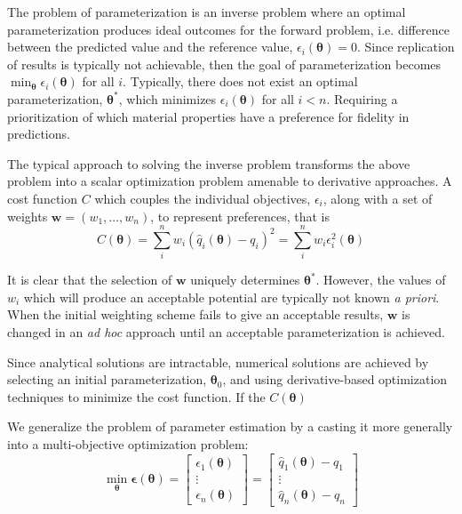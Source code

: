 The problem of parameterization is an inverse problem where an optimal parameterization produces ideal outcomes for the forward problem, i.e. difference between the predicted value and the reference value,
$\epsilon_i(\bm{\theta}) = 0$.
Since replication of results is typically not achievable, then the goal of parameterization becomes
$\min_{\bm{\theta}} \epsilon_i(\bm{\theta})$
for all $i$.  Typically, there does not exist an optimal parameterization, $\bm{\theta}^*$, which minimizes $\epsilon_i(\bm{\theta})$ for all $i < n$.  Requiring a prioritization of which material properties have a preference for fidelity in predictions.

The typical approach to solving the inverse problem transforms the above problem into a scalar optimization problem amenable to derivative approaches.  A cost function $C$ which couples the individual objectives, $\epsilon_i$, along with a set of weights $\bm{w} = (w_1,...,w_n)$, to represent preferences, that is
\begin{equation}
    C(\bm{\theta}) = \sum_i^n w_i (\hat{q}_i(\bm{\theta}) - q_i)^2
                   = \sum_i^n w_i \epsilon_i^2(\bm{\theta})
\end{equation}

It is clear that the selection of $\bm{w}$ uniquely determines $\bm{\theta}^*$.  However, the values of $w_i$ which will produce an acceptable potential are typically not known \emph{a priori}.  When the initial weighting scheme fails to give an acceptable results, $\bm{w}$ is changed in an \emph{ad hoc} approach until an acceptable parameterization is achieved.

Since analytical solutions are intractable, numerical solutions are achieved by selecting an initial parameterization, $\bm{\theta}_0$, and using derivative-based optimization techniques to minimize the cost function.  If the $C(\bm{\theta})$

We generalize the problem of parameter estimation by a casting it more generally into a multi-objective optimization problem:
\begin{equation}
    \min_{\bm{\theta}} \bm{\epsilon}(\bm{\theta})
        = \begin{bmatrix}
            \epsilon_1(\bm{\theta}) \\
            \vdots \\
            \epsilon_n(\bm{\theta})
          \end{bmatrix}
        = \begin{bmatrix}
            \hat{q}_1(\bm{\theta}) - q_1 \\
            \vdots \\
            \hat{q}_n(\bm{\theta}) - q_n
          \end{bmatrix}
\end{equation}

